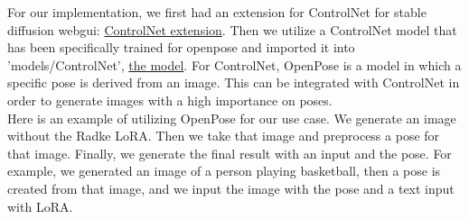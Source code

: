 \documentclass{article}
\begin{document}
For our implementation, we first had an extension for ControlNet for stable diffusion webgui: \href{https://github.com/Mikubill/sd-webui-controlnet}{ControlNet extension}. Then we utilize a ControlNet model that has been specifically trained for openpose and imported it into 'models/ControlNet', \href{https://huggingface.co/lllyasviel/ControlNet-v1-1/tree/69fc48b9cbd98661f6d0288dc59b59a5ccb32a6b}{the model}. For ControlNet, OpenPose is a model in which a specific pose is derived from an image. This can be integrated with ControlNet in order to generate images with a high importance on poses.\\

Here is an example of utilizing OpenPose for our use case. We generate an image without the Radke LoRA. Then we take that image and preprocess a pose for that image. Finally, we generate the final result with an input and the pose. For example, we generated an image of a person playing basketball, then a pose is created from that image, and we input the image with the pose and a text input with LoRA.
\end{document}
